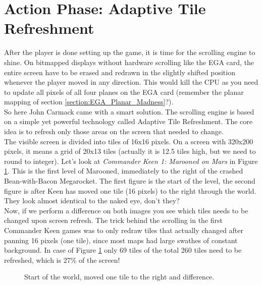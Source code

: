 \documentclass[book.tex]{subfiles}
\begin{document}
\section{Action Phase: Adaptive Tile Refreshment}
After the player is done setting up the game, it is time for the scrolling engine to shine. On bitmapped displays without hardware scrolling like the EGA card, the entire screen have to be erased and redrawn in the slightly shifted position whenever the player moved in any direction. This would kill the CPU as you need to update all pixels of all four planes on the EGA card (remember the planar mapping of section \ref{section:EGA_Planar_Madness}?).\\ 

So here John Carmack came with a smart solution. The scrolling engine is based on a simple yet powerful technology called Adaptive Tile Refreshment. The core idea is to  refresh only those areas on the screen that needed to change.\\

The visible screen is divided into tiles of 16x16 pixels. On a screen with 320x200 pixels, it means a grid of 20x13 tiles (actually it is 12.5 tiles high, but we need to round to integer). Let's look at \textit{Commander Keen 1: Marooned on Mars} in Figure \ref{fig:keen_difference}. This is the first level of Marooned, immediately to the right of the crashed Bean-with-Bacon Megarocket. The first figure is the start of the level, the second figure is after Keen has moved one tile (16 pixels) to the right through the world. They look almost identical to the naked eye, don't they? \\

Now, if we perform a difference on both images you see which tiles needs to be changed upon screen refresh. The trick behind the scrolling in the first Commander Keen games was to only redraw tiles that actually changed after panning 16 pixels (one tile), since most maps had large swathes of constant background. In case of Figure \ref{fig:keen_difference} only 69 tiles of the total 260 tiles need to be refreshed, which is 27\% of the screen! 


\pagebreak
\begin{figure}[H] 
  \centering 
\end{figure}
\begin{figure}[H] 
  \centering 
\end{figure}
\begin{figure}[H] 
  \centering 
  \caption{Start of the world, moved one tile to the right and difference.}
  \label{fig:keen_difference}
\end{figure}
\pagebreak
\end{document}
